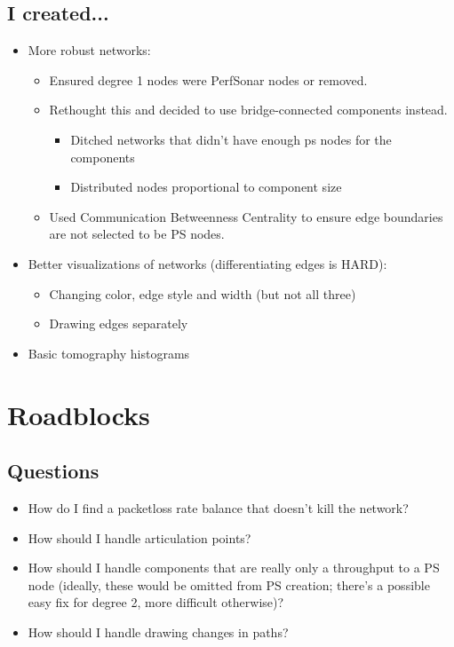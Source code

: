 \documentclass{weeklyreport}
\begin{document}
\subsection*{I created...}
\begin{itemize}
	\item More robust networks:
	\begin{itemize}
		\item Ensured degree 1 nodes were PerfSonar nodes or removed.
		\item Rethought this and decided to use bridge-connected components instead.
		\begin{itemize}
			\item Ditched networks that didn’t have enough ps nodes for the components
			\item Distributed nodes proportional to component size
		\end{itemize}
		\item Used Communication Betweenness Centrality to ensure edge boundaries are not selected to be PS nodes.
	\end{itemize}
	\item Better visualizations of networks (differentiating edges is HARD):
	\begin{itemize}
		\item Changing color, edge style and width (but not all three)
		\item Drawing edges separately		
	\end{itemize}
	\item Basic tomography histograms

\end{itemize}

\pagebreak
\section*{Roadblocks}

\subsection*{Questions}

\begin{itemize}
	\item How do I find a packetloss rate balance that doesn’t kill the network?
	\item How should I handle articulation points?
	\item How should I handle components that are really only a throughput to a PS node (ideally, these would be omitted from PS creation; there's a possible easy fix for degree 2, more difficult otherwise)?
	\item How should I handle drawing changes in paths?
\end{itemize}
\end{document}
